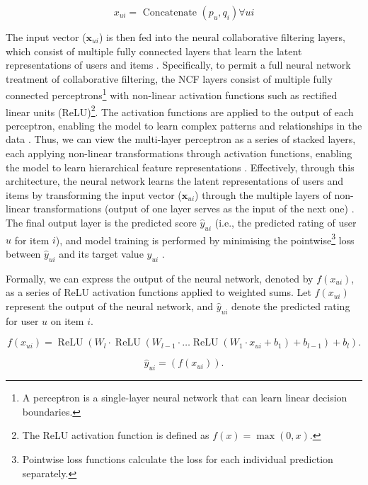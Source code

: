 $$
x_{u i}=\text { Concatenate }\left(p_u, q_i\right) \forall u i
$$

 The input vector ($\mathbf{x}_{ui}$) is then fed into the neural collaborative filtering layers, which consist of multiple fully connected layers that learn the latent representations of users and items \cite{he2017neural}. Specifically, to permit a full neural network treatment of collaborative filtering, the NCF layers consist of multiple fully connected perceptrons\footnote{A perceptron is a single-layer neural network that can learn linear decision boundaries.} with non-linear activation functions such as rectified linear units (ReLU)\footnote{ The ReLU activation function is defined as $f(x) = \max(0, x)$.}. The activation functions are applied to the output of each perceptron, enabling the model to learn complex patterns and relationships in the data \cite{he2017neural}. Thus, we can view the multi-layer perceptron as a series of stacked layers, each applying non-linear transformations through activation functions, enabling the model to learn hierarchical feature representations  \cite{steck2021deep}. Effectively, through this architecture, the neural network learns the latent representations of users and items by transforming the input vector ($\mathbf{x}_{ui}$) through the multiple layers of non-linear transformations (output of one layer serves as the input of the next one) \cite{he2017neural}. The final output layer is the predicted score $\hat{y}_{u i}$ (i.e., the predicted rating of user $u$ for item $i$), and model training is performed by minimising the pointwise\footnote{Pointwise loss functions calculate the loss for each individual prediction separately.} loss between $\hat{y}_{u i}$ and its target value $y_{u i}$ \cite{he2017neural}.
 

 Formally, we can express the output of the neural network, denoted by $f\left(x_{u i}\right)$, as a series of ReLU activation functions applied to weighted sums. Let $f\left(x_{u i}\right)$ represent the output of the neural network, and $\hat{y}_ {u i}$ denote the predicted rating for user $u$ on item $i$.

\begin{equation}
    \label{eq:NCF layers output}
    f\left(x_{ui}\right) = \operatorname{ReLU}\left(W_l \cdot \operatorname{ReLU}\left(W_{l-1} \cdot \ldots \operatorname{ReLU}\left(W_1 \cdot x_{ui} + b_1\right) + b_{l-1}\right) + b_l\right).
\end{equation}
    
\begin{equation}
    \label{eq:output layer prediction}
    \hat{y}_{ui} = \left(f\left(x_{ui}\right)\right).
\end{equation}


